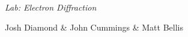 {\LARGE {\em \noindent Lab: Electron Diffraction}}

\large{\noindent Josh Diamond \& John Cummings \& Matt Bellis}

